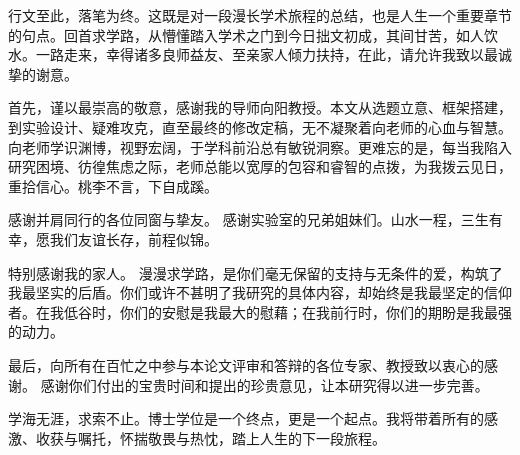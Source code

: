 行文至此，落笔为终。这既是对一段漫长学术旅程的总结，也是人生一个重要章节的句点。回首求学路，从懵懂踏入学术之门到今日拙文初成，其间甘苦，如人饮水。一路走来，幸得诸多良师益友、至亲家人倾力扶持，在此，请允许我致以最诚挚的谢意。

首先，谨以最崇高的敬意，感谢我的导师向阳教授。本文从选题立意、框架搭建，到实验设计、疑难攻克，直至最终的修改定稿，无不凝聚着向老师的心血与智慧。向老师学识渊博，视野宏阔，于学科前沿总有敏锐洞察。更难忘的是，每当我陷入研究困境、彷徨焦虑之际，老师总能以宽厚的包容和睿智的点拨，为我拨云见日，重拾信心。桃李不言，下自成蹊。

感谢并肩同行的各位同窗与挚友。 感谢实验室的兄弟姐妹们。山水一程，三生有幸，愿我们友谊长存，前程似锦。

特别感谢我的家人。 漫漫求学路，是你们毫无保留的支持与无条件的爱，构筑了我最坚实的后盾。你们或许不甚明了我研究的具体内容，却始终是我最坚定的信仰者。在我低谷时，你们的安慰是我最大的慰藉；在我前行时，你们的期盼是我最强的动力。

最后，向所有在百忙之中参与本论文评审和答辩的各位专家、教授致以衷心的感谢。 感谢你们付出的宝贵时间和提出的珍贵意见，让本研究得以进一步完善。

学海无涯，求索不止。博士学位是一个终点，更是一个起点。我将带着所有的感激、收获与嘱托，怀揣敬畏与热忱，踏上人生的下一段旅程。